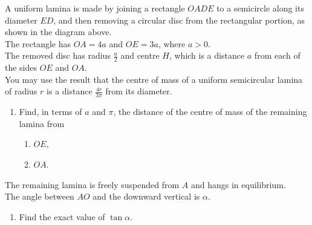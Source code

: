\documentclass[leqno]{article}
\begin{document}
\begin{enumerate}[
  label=\textbf{\arabic*.},
  leftmargin=*,
  topsep=0pt,
  partopsep=0pt,
  parsep=0pt
]
A uniform lamina is made by joining a rectangle $OADE$ to a semicircle along its diameter $ED$, and then removing a circular disc from the rectangular portion, as shown in the diagram above. \\

The rectangle has $OA=4a$ and $OE=3a$, where $a>0$. \\
The removed disc has radius $\frac{a}{2}$ and centre $H$, which is a distance $a$ from each of the sides $OE$ and $OA$. \\

You may use the result that the centre of mass of a uniform semicircular lamina of radius $r$ is a distance $\frac{4r}{3\pi}$ from its diameter. \\
\begin{enumerate}[label=\textbf{(\alph*)}]
\item Find, in terms of $a$ and $\pi$, the distance of the centre of mass of the remaining lamina from
\begin{enumerate}[label=(\roman*)]
\item $OE$,
\item $OA$.
\end{enumerate}
\end{enumerate}
The remaining lamina is freely suspended from $A$ and hangs in equilibrium. \\
The angle between $AO$ and the downward vertical is $\alpha$. \\
\begin{enumerate}[label=\textbf{(\alph*)}, resume]
\item Find the exact value of $\tan\alpha$.  \\
\end{enumerate}

\newpage

\questionitem


\end{enumerate}
\end{document}
